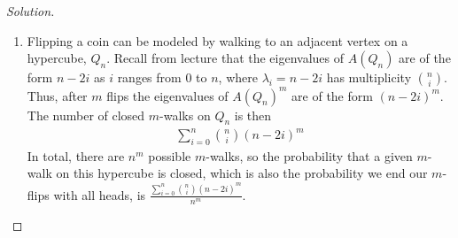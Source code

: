 \documentclass[11pt]{scrartcl}
\begin{document}
\begin{proof}[Solution]
\begin{enumerate}[{i}]
    \item Flipping a coin can be modeled by walking to an adjacent vertex on a hypercube, $Q_n$. Recall from lecture that the eigenvalues of $A(Q_n)$ are of the form $n-2i$ as $i$ ranges from $0$ to $n$, where $\lambda_i=n-2i$ has multiplicity $\binom{n}{i}$. Thus, after $m$ flips the eigenvalues of $A{(Q_n)}^m$ are of the form ${(n-2i)}^m$. The number of closed $m$-walks on $Q_n$ is then
    \begin{align*}
        \sum_{i = 0}^{n} \binom{n}{i} (n-2i)^m
    \end{align*}
    In total, there are $n^m$ possible $m$-walks, so the probability that a given $m$-walk on this hypercube is closed, which is also the probability we end our $m$-flips with all heads, is $\frac{\sum_{i = 0}^{n} \binom{n}{i} (n-2i)^m}{n^m}$.


\end{enumerate}
\end{proof}
\end{document}
